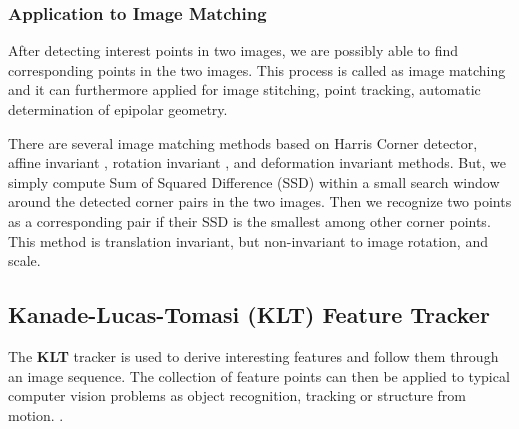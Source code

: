 \documentclass{article}
\begin{document}
\subsubsection{Application to Image Matching}\label{SSS:HarrisImageMatch}

After detecting interest points in two images, we are possibly able to find corresponding points in the two images. 
This process is called as image matching and it can furthermore applied for image stitching, point tracking, automatic determination of epipolar geometry. 

There are several image matching methods based on Harris Corner detector, affine invariant \cite{tTuytelaars00}, rotation invariant  \cite{jMatas03}, and deformation invariant \cite{hLing05} methods. 
But, we simply compute Sum of Squared Difference (SSD) within a small search window around the detected corner pairs in the two images. 
Then we recognize two points as a corresponding pair if their SSD is the smallest among other corner points. 
This method is translation invariant, but non-invariant to image rotation, and scale. 

\subsection{Kanade-Lucas-Tomasi (KLT) Feature Tracker}

The {\bf KLT} tracker is used to derive interesting features and follow them through an image sequence. The collection of feature points can then be applied to typical computer vision problems as object recognition, tracking or structure from motion.
\cite{bLucas81} \cite{cTomasi91} \cite{jShi94} \cite{sBirchfield97}.
\end{document}
